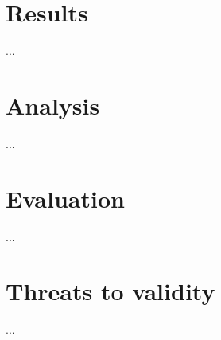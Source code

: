 \section{Results}
...

\section{Analysis}
...

\section{Evaluation}
...

\section{Threats to validity}
...


%
